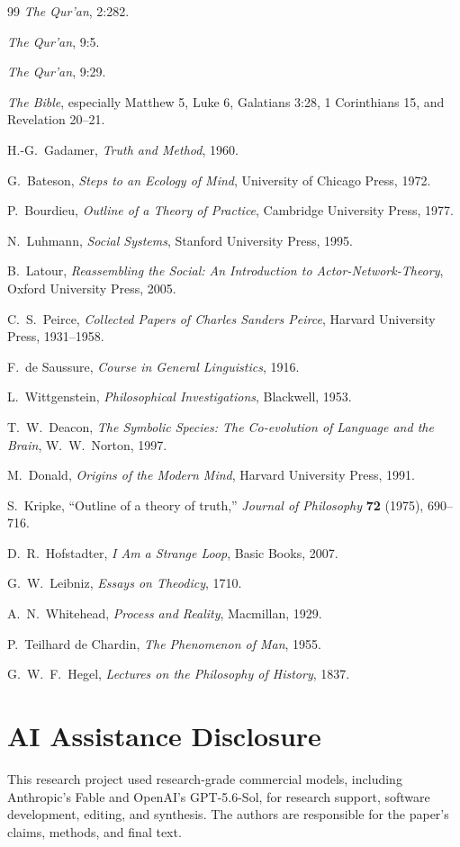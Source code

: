 \documentclass[11pt]{article}
\theoremstyle{remark}
\theoremstyle{plain}
\begin{document}
\begin{thebibliography}{99}
\emph{The Qur'an}, 2:282.

\emph{The Qur'an}, 9:5.

\emph{The Qur'an}, 9:29.

\emph{The Bible},
especially Matthew 5, Luke 6, Galatians 3:28, 1 Corinthians 15, and
Revelation 20--21.

H.-G.\ Gadamer,
\emph{Truth and Method},
1960.

G.\ Bateson,
\emph{Steps to an Ecology of Mind},
University of Chicago Press, 1972.

P.\ Bourdieu,
\emph{Outline of a Theory of Practice},
Cambridge University Press, 1977.

N.\ Luhmann,
\emph{Social Systems},
Stanford University Press, 1995.

B.\ Latour,
\emph{Reassembling the Social: An Introduction to Actor-Network-Theory},
Oxford University Press, 2005.

C.\ S.\ Peirce,
\emph{Collected Papers of Charles Sanders Peirce},
Harvard University Press, 1931--1958.

F.\ de Saussure,
\emph{Course in General Linguistics},
1916.

L.\ Wittgenstein,
\emph{Philosophical Investigations},
Blackwell, 1953.

T.\ W.\ Deacon,
\emph{The Symbolic Species: The Co-evolution of Language and the Brain},
W.\ W.\ Norton, 1997.

M.\ Donald,
\emph{Origins of the Modern Mind},
Harvard University Press, 1991.

S.\ Kripke,
``Outline of a theory of truth,''
\emph{Journal of Philosophy} \textbf{72} (1975), 690--716.

D.\ R.\ Hofstadter,
\emph{I Am a Strange Loop},
Basic Books, 2007.

G.\ W.\ Leibniz,
\emph{Essays on Theodicy},
1710.

A.\ N.\ Whitehead,
\emph{Process and Reality},
Macmillan, 1929.

P.\ Teilhard de Chardin,
\emph{The Phenomenon of Man},
1955.

G.\ W.\ F.\ Hegel,
\emph{Lectures on the Philosophy of History},
1837.

\end{thebibliography}

\section*{AI Assistance Disclosure}
This research project used research-grade commercial models, including
Anthropic's Fable and OpenAI's GPT-5.6-Sol, for research support, software
development, editing, and synthesis. The authors are responsible for the
paper's claims, methods, and final text.
\end{document}
